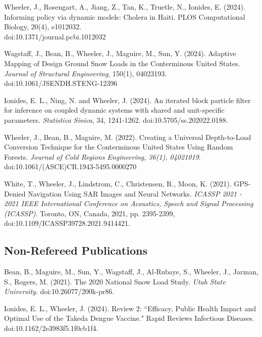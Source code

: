 \documentclass[11pt]{article}
\newenvironment {reflist}
                {
                 \begin{list}{}
                 {\setlength{\labelwidth}{0mm}
                  \setlength{\leftmargin}{8mm}
                  \setlength{\itemindent}{-3mm}
                  \setlength{\labelsep}{0mm}
                  \setlength{\parsep}{0.1 ex}
                  \setlength{\itemsep}{0.1cm}
      \setlength{\topsep}{0.15cm}}} %
   {\end{list}}
\begin{document}
\begin{reflist}

    \item Wheeler, J., Rosengart, A., Jiang, Z., Tan, K., Truetle, N., Ionides, E. (2024). Informing policy via dynamic models: Cholera in Haiti. {PLOS Computational Biology}, 20(4), e1012032. \\ doi:10.1371/journal.pcbi.1012032

    \item Wagstaff, J., Bean, B., Wheeler, J., Maguire, M., Sun, Y. (2024). Adaptive Mapping of Design Ground Snow Loads in the Conterminous United States. {\it Journal of Structural Engineering}, 150(1), 04023193. doi:10.1061/JSENDH.STENG-12396

    \item Ionides, E. L., Ning, N. and Wheeler, J. (2024). An iterated block particle filter for inference on coupled dynamic systems with shared and unit-specific parameters. {\it Statistica Sinica}, 34, 1241-1262. doi:10.5705/ss.202022.0188.

    \item Wheeler, J., Bean, B., Maguire, M. (2022). Creating a Universal Depth-to-Load Conversion Technique for the Conterminous United States Using Random Forests. {\it Journal of Cold Regions Engineering, 36(1), 04021019}. doi:10.1061/(ASCE)CR.1943-5495.0000270

    \item White, T., Wheeler, J., Lindstrom, C., Christensen, R., Moon, K. (2021). GPS-Denied Navigation Using SAR Images and Neural Networks. {\it ICASSP 2021 - 2021 IEEE International Conference on Acoustics, Speech and Signal Processing (ICASSP)}. Toronto, ON, Canada, 2021, pp. 2395-2399, doi:10.1109/ICASSP39728.2021.9414421.

\end{reflist}

\subsection*{Non-Refereed Publications}

\begin{reflist}

    \item Bean, B., Maguire, M., Sun, Y., Wagstaff, J., Al-Rubaye, S., Wheeler, J., Jarman, S., Rogers, M. (2021). The 2020 National Snow Load Study. {\it Utah State University}. doi:10.26077/200k-pr86.

    \item Ionides, E. L., Wheeler, J. (2024). Review 2: ``Efficacy, Public Health Impact and Optimal Use of the Takeda Dengue Vaccine." Rapid Reviews Infectious Diseases. doi:10.1162/2e3983f5.1f0cb1f4.

\end{reflist}
\end{document}
